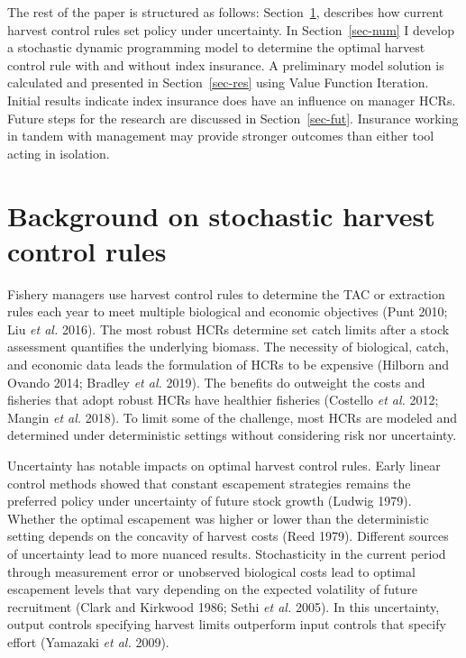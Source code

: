 \documentclass[
  letterpaper,
  DIV=11,
  numbers=noendperiod]{scrartcl}
\begin{document}
The rest of the paper is structured as follows: Section~\ref{sec-hcr},
describes how current harvest control rules set policy under
uncertainty. In Section~\ref{sec-num} I develop a stochastic dynamic
programming model to determine the optimal harvest control rule with and
without index insurance. A preliminary model solution is calculated and
presented in Section~\ref{sec-res} using Value Function Iteration.
Initial results indicate index insurance does have an influence on
manager HCRs. Future steps for the research are discussed in
Section~\ref{sec-fut}. Insurance working in tandem with management may
provide stronger outcomes than either tool acting in isolation.

\hypertarget{sec-hcr}{%
\section{Background on stochastic harvest control rules}\label{sec-hcr}}

Fishery managers use harvest control rules to determine the TAC or
extraction rules each year to meet multiple biological and economic
objectives (Punt 2010; Liu \emph{et al.} 2016). The most robust HCRs
determine set catch limits after a stock assessment quantifies the
underlying biomass. The necessity of biological, catch, and economic
data leads the formulation of HCRs to be expensive (Hilborn and Ovando
2014; Bradley \emph{et al.} 2019). The benefits do outweight the costs
and fisheries that adopt robust HCRs have healthier fisheries (Costello
\emph{et al.} 2012; Mangin \emph{et al.} 2018). To limit some of the
challenge, most HCRs are modeled and determined under deterministic
settings without considering risk nor uncertainty.

Uncertainty has notable impacts on optimal harvest control rules. Early
linear control methods showed that constant escapement strategies
remains the preferred policy under uncertainty of future stock growth
(Ludwig 1979). Whether the optimal escapement was higher or lower than
the deterministic setting depends on the concavity of harvest costs
(Reed 1979). Different sources of uncertainty lead to more nuanced
results. Stochasticity in the current period through measurement error
or unobserved biological costs lead to optimal escapement levels that
vary depending on the expected volatility of future recruitment (Clark
and Kirkwood 1986; Sethi \emph{et al.} 2005). In this uncertainty,
output controls specifying harvest limits outperform input controls that
specify effort (Yamazaki \emph{et al.} 2009).
\end{document}

